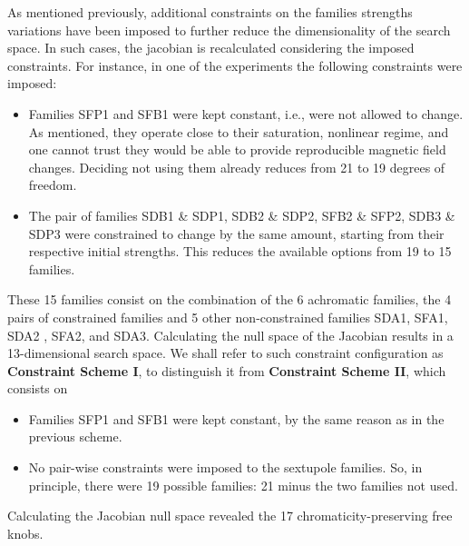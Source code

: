 As mentioned previously, additional constraints on the families strengths variations  have been imposed to further reduce the dimensionality of the search space. In such cases, the jacobian is recalculated considering the imposed constraints. For instance, in one of the experiments the following constraints were imposed:
\begin{itemize}
    \item Families SFP1 and SFB1 were kept constant, i.e., were not allowed to change. As mentioned, they operate close to their saturation, nonlinear regime, and one cannot trust they would be able to provide reproducible magnetic field changes. Deciding not using them already reduces from 21 to 19 degrees of freedom.
    \item The pair of families SDB1 \& SDP1, SDB2 \& SDP2, SFB2 \& SFP2, SDB3 \& SDP3 were constrained to change by the same amount, starting from their respective initial strengths. This reduces the available options from 19 to 15 families.
\end{itemize}
These 15 families consist on the combination of the 6 achromatic families, the 4 pairs of constrained families and 5 other non-constrained families SDA1, SFA1, SDA2 , SFA2, and SDA3.
Calculating the null space of the Jacobian results in a 13-dimensional search space. We shall refer to such constraint configuration as \textbf{Constraint Scheme I}, to distinguish it from \textbf{Constraint Scheme II}, which consists on

\begin{itemize}
    \item Families SFP1 and SFB1 were kept constant, by the same reason as in the previous scheme.
    \item No pair-wise constraints were imposed to the sextupole families. So, in principle, there were 19 possible families: 21 minus the two families not used.
\end{itemize}
Calculating the Jacobian null space revealed the 17 chromaticity-preserving free knobs.


